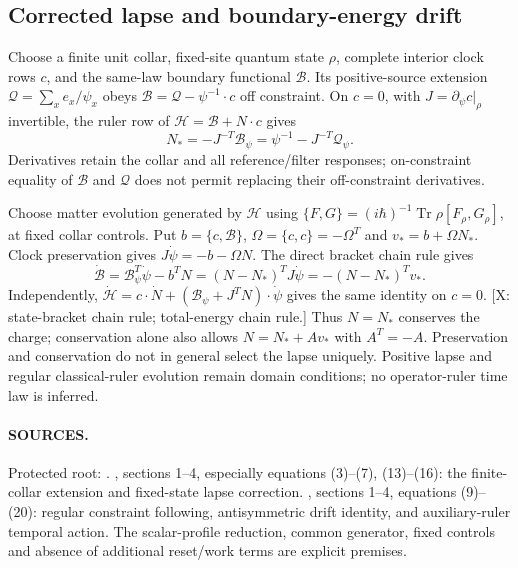 \subsection*{Corrected lapse and boundary-energy drift}
Choose a finite unit collar, fixed-site quantum state $\rho$, complete
interior clock rows $c$, and the same-law boundary functional
$\mathcal B$.  Its positive-source extension
$\mathcal Q=\sum_xe_x/\psi_x$ obeys
$\mathcal B=\mathcal Q-\psi^{-1}\cdot c$ off constraint.
On $c=0$, with $J=\partial_\psi c|_\rho$ invertible, the ruler row
of $\mathcal H=\mathcal B+N\cdot c$ gives
\[
 N_*=-J^{-T}\mathcal B_\psi
     =\psi^{-1}-J^{-T}\mathcal Q_\psi .
\]
Derivatives retain the collar and all reference/filter responses;
on-constraint equality of $\mathcal B$ and $\mathcal Q$ does not
permit replacing their off-constraint derivatives.

Choose matter evolution generated by $\mathcal H$ using
$\{F,G\}=(i\hbar)^{-1}\operatorname{Tr}\rho[F_\rho,G_\rho]$,
at fixed collar controls.  Put
$b=\{c,\mathcal B\}$, $\Omega=\{c,c\}=-\Omega^T$ and
$v_*=b+\Omega N_*$.  Clock preservation gives
$J\dot\psi=-b-\Omega N$.  The direct bracket chain rule gives
\[
 \dot{\mathcal B}
 =\mathcal B_\psi^T\dot\psi-b^TN
 =(N-N_*)^TJ\dot\psi
 =-(N-N_*)^Tv_* .
\]
Independently, $\dot{\mathcal H}
=c\cdot\dot N+(\mathcal B_\psi+J^TN)\cdot\dot\psi$
gives the same identity on $c=0$.
[X: state-bracket chain rule; total-energy chain rule.]
Thus $N=N_*$ conserves the charge; conservation alone also allows
$N=N_*+Av_*$ with $A^T=-A$.
Preservation and conservation do not in general select the lapse uniquely.
Positive lapse and regular classical-ruler evolution remain domain
conditions; no operator-ruler time law is inferred.

\paragraph*{SOURCES.}
\begingroup\footnotesize
Protected root:
.
,
sections 1--4, especially equations (3)--(7), (13)--(16):
the finite-collar extension and fixed-state lapse correction.
,
sections 1--4, equations (9)--(20): regular constraint following,
antisymmetric drift identity, and auxiliary-ruler temporal action.
The scalar-profile reduction, common generator, fixed controls and
absence of additional reset/work terms are explicit premises.
\endgroup
